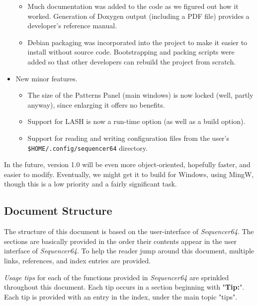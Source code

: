 \documentclass[
 11pt,
 twoside,
 a4paper,
 headinclude,
 footinclude,
 final                                 %
]{article}
\begin{document}
\begin{itemize}
\begin{itemize}
         \item Much documentation was added to the code as we figured
            out how it worked.  Generation of Doxygen output (including a PDF
            file) provides a developer's reference manual.
         \item Debian packaging was incorporated into the project to make it
            easier to install without source code.  Bootstrapping and
            packing scripts were added so that other developers can rebuild the
            project from scratch.
      \end{itemize}
      \item New minor features.
      \begin{itemize}
         \item The size of the Patterns Panel (main windows) is now locked
            (well, partly anyway), since enlarging it offers no benefits.
         \item Support for LASH is now a run-time option (as well as a build
            option).
         \item Support for reading and writing configuration files from the
            user's \texttt{\$HOME/.config/sequencer64} directory.
      \end{itemize}
   \end{itemize}

   In the future, version 1.0 will be even more object-oriented, hopefully
   faster, and easier to modify.  Eventually, we might get it to build
   for Windows, using MingW, though this is a low priority and a fairly
   significant task.

\subsection{Document Structure}
\label{subsec:introduction_document_structure}

   The structure of this document is based on the user-interface of
   \textsl{Sequencer64}.  The sections are basically provided in the order
   their contents appear in the user interface of \textsl{Sequencer64}.  To
   help the reader jump around this document, multiple links, references,
   and index entries are provided.

   \textsl{Usage tips}
   for each of the functions provided in
   \textsl{Sequencer64} are sprinkled throughout this document.
   Each tip occurs in a section beginning with "\textbf{Tip:}".
   Each tip is provided with an entry in the index, under the
   main topic "tips".
\end{document}
